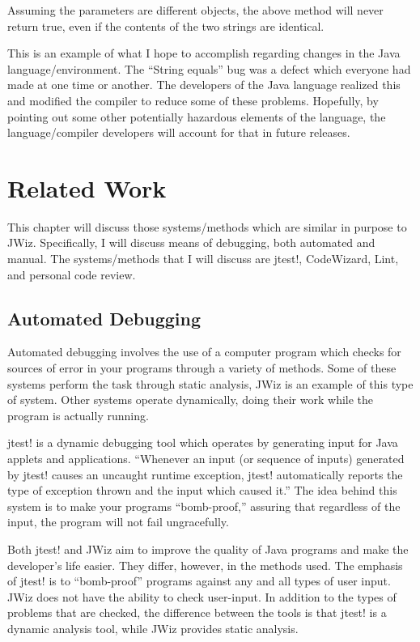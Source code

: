 Assuming the parameters are different objects, the above method will never
return true, even if the contents of the two strings are identical.

This is an example of what I hope to accomplish regarding changes in the
Java language/environment.  The ``String equals'' bug was a defect which
everyone had made at one time or another.  The developers of the Java
language realized this and modified the compiler to reduce some of these
problems.  Hopefully, by pointing out some other potentially hazardous
elements of the language, the language/compiler developers will account for
that in future releases.

\chapter{Related Work}
This chapter will discuss those systems/methods which are similar in
purpose to JWiz.  Specifically, I will discuss means of debugging, both
automated and manual.  The systems/methods that I will discuss are
jtest!\cite{jtest97}, CodeWizard\cite{CodeWizard97}, Lint\cite{Darwin88},
and personal code review\cite{Humphrey95}.

\section{Automated Debugging}
Automated debugging involves the use of a computer program which checks for 
sources of error in your programs through a variety of methods.  Some of
these systems perform the task through static analysis, JWiz is an example
of this type of system.  Other systems operate dynamically, doing their
work while the program is actually running.

jtest! is a dynamic debugging tool which operates by generating input for
Java applets and applications.  ``Whenever an input (or sequence of inputs) 
generated by jtest! causes an uncaught runtime exception, jtest!
automatically reports the type of exception thrown and the input which
caused it.''\cite{jtest97}  The idea behind this system is to make your programs
``bomb-proof,'' assuring that regardless of the input, the program will not 
fail ungracefully.  

Both jtest! and JWiz aim to improve the quality of Java programs and make
the developer's life easier.  They differ, however, in the methods used.
The emphasis of jtest! is to ``bomb-proof'' programs against any and all
types of user input.  JWiz does not have the ability to check user-input.
In addition to the types of problems that are checked, the difference
between the tools is that jtest! is a dynamic analysis tool, while JWiz
provides static analysis.

